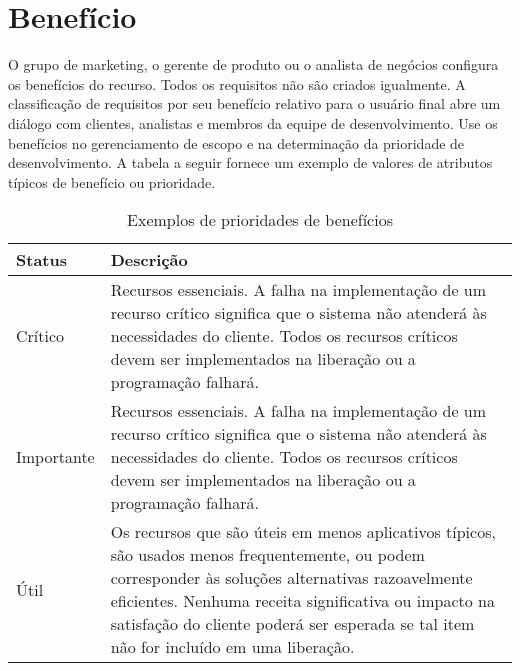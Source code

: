 \documentclass{report}
\begin{document}
\section{Benefício}

O grupo de marketing, o gerente de produto ou o analista de negócios configura
os benefícios do recurso. Todos os requisitos não são criados igualmente. A
classificação de requisitos por seu benefício relativo para o usuário final
abre um diálogo com clientes, analistas e membros da equipe de desenvolvimento.
Use os benefícios no gerenciamento de escopo e na determinação da prioridade de
desenvolvimento. A tabela a seguir fornece um exemplo de valores de atributos
típicos de benefício ou prioridade.

\begin{table}[H]
	\centering

	\begin{tabularx}{\textwidth}{X|X}
		\textbf{Status} & \textbf{Descrição}                                                                                                                                                                                                                                                                                     \\
		\hline
		Crítico         & Recursos essenciais. A falha na implementação de um recurso crítico significa que o sistema não atenderá às necessidades do cliente. Todos os recursos críticos devem ser implementados na liberação ou a programação falhará.                                                                         \\
		Importante      & Recursos essenciais. A falha na implementação de um recurso crítico significa que o sistema não atenderá às necessidades do cliente. Todos os recursos críticos devem ser implementados na liberação ou a programação falhará.                                                                         \\
		Útil            & Os recursos que são úteis em menos aplicativos típicos, são usados menos frequentemente, ou podem corresponder às soluções alternativas razoavelmente eficientes. Nenhuma receita significativa ou impacto na satisfação do cliente poderá ser esperada se tal item não for incluído em uma liberação. \\
		\hline
	\end{tabularx}

	\caption[Prioridades de benefícios]{Exemplos de prioridades de benefícios}
	\label{tab:prioridades}
\end{table}
\end{document}
